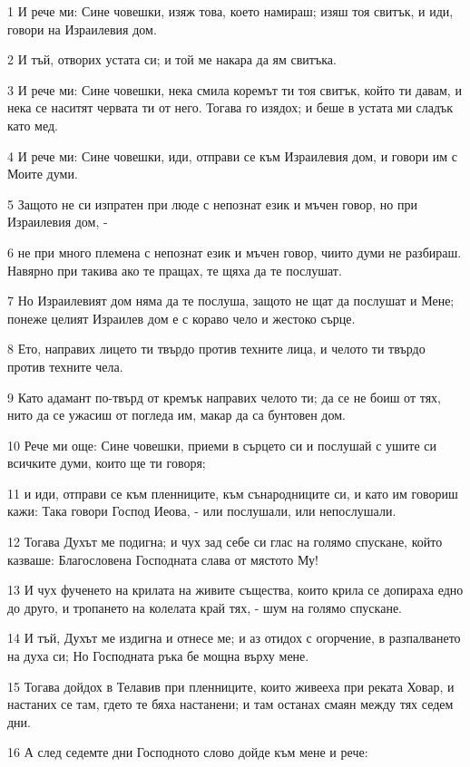 \par 1 И рече ми: Сине човешки, изяж това, което намираш; изяш тоя свитък, и иди, говори на Израилевия дом.
\par 2 И тъй, отворих устата си; и той ме накара да ям свитъка.
\par 3 И рече ми: Сине човешки, нека смила коремът ти тоя свитък, който ти давам, и нека се наситят червата ти от него. Тогава го изядох; и беше в устата ми сладък като мед.
\par 4 И рече ми: Сине човешки, иди, отправи се към Израилевия дом, и говори им с Моите думи.
\par 5 Защото не си изпратен при люде с непознат език и мъчен говор, но при Израилевия дом, -
\par 6 не при много племена с непознат език и мъчен говор, чиито думи не разбираш. Навярно при такива ако те пращах, те щяха да те послушат.
\par 7 Но Израилевият дом няма да те послуша, защото не щат да послушат и Мене; понеже целият Израилев дом е с кораво чело и жестоко сърце.
\par 8 Ето, направих лицето ти твърдо против техните лица, и челото ти твърдо против техните чела.
\par 9 Като адамант по-твърд от кремък направих челото ти; да се не боиш от тях, нито да се ужасиш от погледа им, макар да са бунтовен дом.
\par 10 Рече ми още: Сине човешки, приеми в сърцето си и послушай с ушите си всичките думи, които ще ти говоря;
\par 11 и иди, отправи се към пленниците, към сънародниците си, и като им говориш кажи: Така говори Господ Иеова, - или послушали, или непослушали.
\par 12 Тогава Духът ме подигна; и чух зад себе си глас на голямо спускане, който казваше: Благословена Господната слава от мястото Му!
\par 13 И чух фученето на крилата на живите същества, които крила се допираха едно до друго, и тропането на колелата край тях, - шум на голямо спускане.
\par 14 И тъй, Духът ме издигна и отнесе ме; и аз отидох с огорчение, в разпалването на духа си; Но Господната ръка бе мощна върху мене.
\par 15 Тогава дойдох в Телавив при пленниците, които живееха при реката Ховар, и настаних се там, гдето те бяха настанени; и там останах смаян между тях седем дни.
\par 16 А след седемте дни Господното слово дойде към мене и рече:
